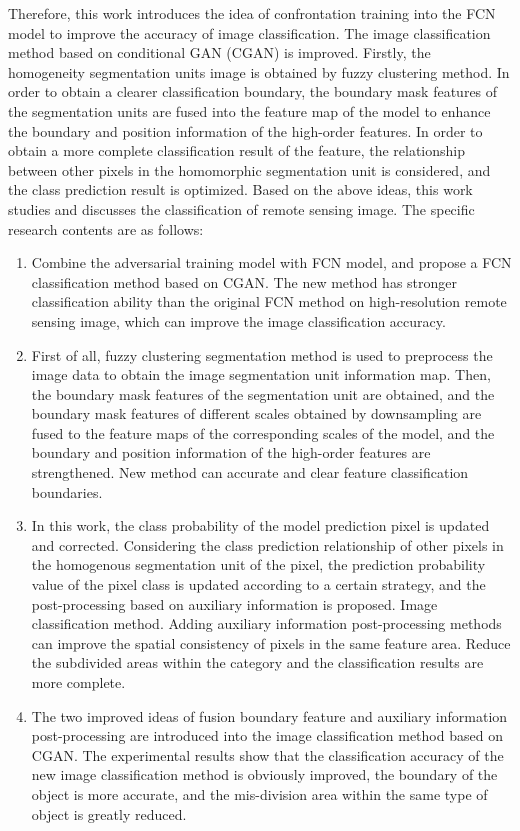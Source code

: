 \begin{eabstract}
  Therefore, this work introduces the idea of ​​confrontation training into the FCN model to improve the accuracy of image classification. The image classification method based on conditional GAN (CGAN) is improved. Firstly, the homogeneity segmentation units image is obtained by fuzzy clustering method. In order to obtain a clearer classification boundary, the boundary mask features of the segmentation units are fused into the feature map of the model to enhance the boundary and position information of the high-order features. In order to obtain a more complete classification result of the feature, the relationship between other pixels in the homomorphic segmentation unit is considered, and the class prediction result is optimized. Based on the above ideas, this work studies and discusses the classification of remote sensing image. The specific research contents are as follows:
\begin{enumerate}[(1)]
  \item Combine the adversarial training model with FCN model, and propose a FCN classification method based on CGAN. The new method has stronger classification ability than the original FCN method on high-resolution remote sensing image, which can improve the image classification accuracy.
  \item First of all, fuzzy clustering segmentation method is used to preprocess the image data to obtain the image segmentation unit information map. Then, the boundary mask features of the segmentation unit are obtained, and the boundary mask features of different scales obtained by downsampling are fused to the feature maps of the corresponding scales of the model, and the boundary and position information of the high-order features are strengthened. New method can accurate and clear feature classification boundaries.
  \item In this work, the class probability  of the model prediction pixel is updated and corrected. Considering the class prediction relationship of other pixels in the homogenous segmentation unit of the pixel, the prediction probability value of the pixel class is updated according to a certain strategy, and the post-processing based on auxiliary information is proposed. Image classification method. Adding auxiliary information post-processing methods can improve the spatial consistency of pixels in the same feature area. Reduce the subdivided areas within the category and the classification results are more complete.
  \item The two improved ideas of fusion boundary feature and auxiliary information post-processing are introduced into the image classification method based on CGAN. The experimental results show that the classification accuracy of the new image classification method is obviously improved, the boundary of the object is more accurate, and the mis-division area within the same type of object is greatly reduced.
  
\end{enumerate}

\end{eabstract}

